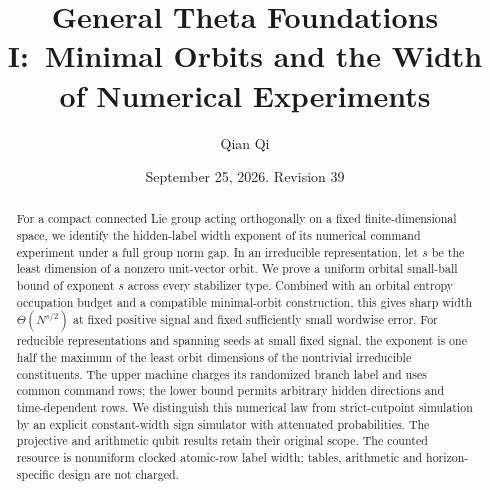 \documentclass[11pt]{amsart}
\title[Minimal orbits and numerical width]{General Theta Foundations I:\
Minimal Orbits and the Width of Numerical Experiments}
\author{Qian Qi}
\date{September 25, 2026. Revision 39}
\theoremstyle{definition}\newtheorem{definition}[theorem]{Definition}
\theoremstyle{remark}\newtheorem{remark}[theorem]{Remark}
\begin{document}
\begin{abstract}
For a compact connected Lie group acting orthogonally on a fixed
finite-dimensional space, we identify the hidden-label width exponent
of its numerical command experiment under a full group norm gap.
In an irreducible representation, let $s$ be the least dimension of a
nonzero unit-vector orbit. We prove a uniform orbital small-ball bound
of exponent $s$ across every stabilizer type. Combined with an orbital
entropy occupation budget and a compatible minimal-orbit construction,
this gives sharp width $\Theta(N^{s/2})$ at fixed positive signal and
fixed sufficiently small wordwise error. For reducible representations
and spanning seeds at small fixed signal, the exponent is one half
the maximum of the least orbit dimensions of the nontrivial irreducible
constituents. The upper machine charges its randomized branch label
and uses common command rows; the lower bound permits arbitrary
hidden directions and time-dependent rows. We distinguish this
numerical law from strict-cutpoint simulation by an explicit
constant-width sign simulator with attenuated probabilities. The
projective and arithmetic qubit results retain their original scope.
The counted resource is nonuniform clocked atomic-row label width;
tables, arithmetic and horizon-specific design are not charged.
\end{abstract}
\maketitle









\appendix





\end{document}
